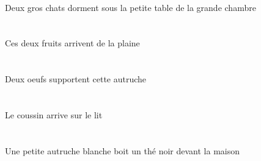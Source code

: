 \begin{exe}
   \INDDuAbsG{}   \grosDDuG{}   \chatDDuAbsG{}    \DEFSgOblG{}    \DEFSgOblG{}   \grandBSgG{}   \chambreBSgOblG{}   \DEG{}   \petitDSgG{}   \tableDSgOblG{}   \SOUSG{}  \dormirViPrsDDuG{} \\
 Deux gros chats dorment sous la petite table de la grande chambre
\ex\glll
   \DEMDuAbs{}   \fruitADuAbs{}    \DEFSgObl{}   \plaineASgObl{}   \DE{}  \arriverViPrsADu{} \\
   \DEMDuAbsP{}   \fruitADuAbsP{}    \DEFSgOblP{}   \plaineASgOblP{}   \DEP{}  \arriverViPrsADuP{} \\
   \DEMDuAbsG{}   \fruitADuAbsG{}    \DEFSgOblG{}   \plaineASgOblG{}   \DEG{}  \arriverViPrsADuG{} \\
 Ces deux fruits arrivent de la plaine
\ex\glll
   \INDDuErg{}   \oeufCDuErg{}   \DEMSgAbs{}   \autrucheBSgAbs{}  \supporterVtPrsBSg{} \\
   \INDDuErgP{}   \oeufCDuErgP{}   \DEMSgAbsP{}   \autrucheBSgAbsP{}  \supporterVtPrsBSgP{} \\
   \INDDuErgG{}   \oeufCDuErgG{}   \DEMSgAbsG{}   \autrucheBSgAbsG{}  \supporterVtPrsBSgG{} \\
 Deux oeufs supportent cette autruche
\ex\glll
   \DEFSgAbs{}   \coussinBSgAbs{}    \DEFSgObl{}   \litDSgObl{}   \SUR{}  \arriverViPrsBSg{} \\
   \DEFSgAbsP{}   \coussinBSgAbsP{}    \DEFSgOblP{}   \litDSgOblP{}   \SURP{}  \arriverViPrsBSgP{} \\
   \DEFSgAbsG{}   \coussinBSgAbsG{}    \DEFSgOblG{}   \litDSgOblG{}   \SURG{}  \arriverViPrsBSgG{} \\
 Le coussin arrive sur le lit
\ex\glll
   \INDSgErg{}   \petitBSg{}   \blancBSg{}   \autrucheBSgErg{}    \DEFSgObl{}   \maisonDSgObl{}   \DEVANT{}   \INDSgAbs{}   \noirBSg{}   \theBSgAbs{}  \boireVtPrsBSg{} \\
   \INDSgErgP{}   \petitBSgP{}   \blancBSgP{}   \autrucheBSgErgP{}    \DEFSgOblP{}   \maisonDSgOblP{}   \DEVANTP{}   \INDSgAbsP{}   \noirBSgP{}   \theBSgAbsP{}  \boireVtPrsBSgP{} \\
   \INDSgErgG{}   \petitBSgG{}   \blancBSgG{}   \autrucheBSgErgG{}    \DEFSgOblG{}   \maisonDSgOblG{}   \DEVANTG{}   \INDSgAbsG{}   \noirBSgG{}   \theBSgAbsG{}  \boireVtPrsBSgG{} \\
 Une petite autruche blanche boit un thé noir devant la maison
\ex\glll
   \DEFPlErg{}   \litDPlErg{}   \DEFDuAbs{}   \grosCDu{}   \chasseurCDuAbs{}  \supporterVtPrsCDu{} \\
   \DEFPlErgP{}   \litDPlErgP{}   \DEFDuAbsP{}   \grosCDuP{}   \chasseurCDuAbsP{}  \supporterVtPrsCDuP{} \\

\end{exe}

